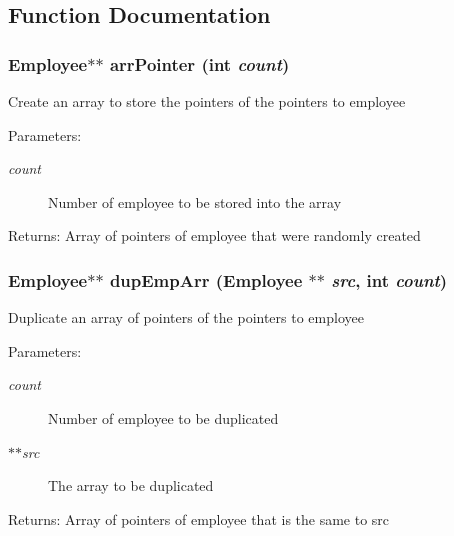 \subsection{Function Documentation}
\subsubsection{\setlength{\rightskip}{0pt plus 5cm}\bf{Employee}$\ast$$\ast$ arr\-Pointer (int {\em count})}\label{employee_8h_a9a68360f1e967527dc28cf9a58e3524}


Create an array to store the pointers of the pointers to employee \begin{Desc}
\item[Parameters:]
\begin{description}
\item[{\em count}]Number of employee to be stored into the array \end{description}
\end{Desc}
\begin{Desc}
\item[Returns:]Array of pointers of employee that were randomly created \end{Desc}
\subsubsection{\setlength{\rightskip}{0pt plus 5cm}\bf{Employee}$\ast$$\ast$ dup\-Emp\-Arr (\bf{Employee} $\ast$$\ast$ {\em src}, int {\em count})}\label{employee_8h_492f9f099d5fd760173e275afd9a204e}


Duplicate an array of pointers of the pointers to employee \begin{Desc}
\item[Parameters:]
\begin{description}
\item[{\em count}]Number of employee to be duplicated \item[{\em $\ast$$\ast$src}]The array to be duplicated \end{description}
\end{Desc}
\begin{Desc}
\item[Returns:]Array of pointers of employee that is the same to src \end{Desc}
